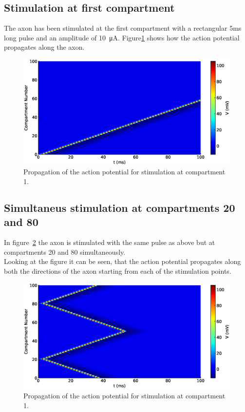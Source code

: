 \documentclass{scrartcl}			%
\begin{document}
\subsection{Stimulation at first compartment}
The axon has been stimulated at the first compartment with a rectangular 5ms long pulse and an amplitude of \SI{10}{\micro\ampere}. Figure\ref{fig:comp1} shows how the action potential propagates along the axon.

\begin{figure}[H]
\centering
\includegraphics[width=\linewidth]{imgs/compartment_model0.eps} 
    \caption{Propagation of the action potential for stimulation at compartment 1.} 
    \label{fig:comp1} 
\end{figure}

\subsection{Simultaneus stimulation at compartments 20 and 80}
In figure~\ref{fig:comp2} the axon is stimulated with the same pulse as above but at compartments 20 and 80 simultaneously.\\ Looking at the figure it can be seen, that the action potential propagates along both the directions of the axon starting from each of the stimulation points.

\begin{figure}[H]
\centering
\includegraphics[width=\linewidth]{imgs/compartment_model2080.eps} 
    \caption{Propagation of the action potential for stimulation at compartment 1.} 
    \label{fig:comp2} 
\end{figure}
\end{document}

